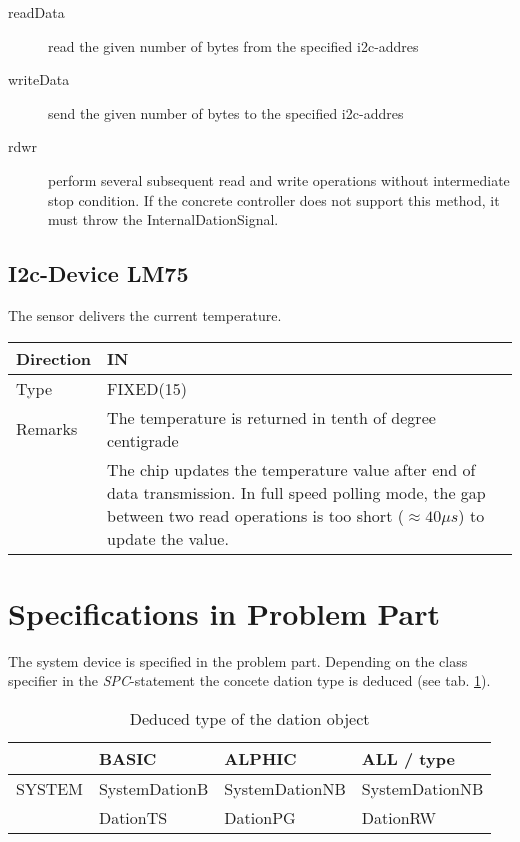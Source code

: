 \begin{description}
\item[readData] read the given number of bytes from the specified 
   i2c-addres
\item[writeData] send the given number of bytes to the specified
    i2c-addres
\item[rdwr] perform several subsequent read and write operations 
   without intermediate stop condition. If the concrete controller
   does not support this method, it must throw the InternalDationSignal.
\end{description}

\subsection{I2c-Device LM75}
The sensor delivers the current temperature.

\begin{tabular}{|l|p{10cm}|}
\hline
Direction & IN \\
\hline
Type & FIXED(15) \\
\hline
Remarks& The temperature is returned in tenth of degree centigrade\\
& The chip updates the temperature value after end of data transmission. 
  In full speed polling mode, the gap between two read operations is too 
  short ($\approx 40 \mu s$) to update the value.\\
\hline
\end{tabular}

\section{Specifications in Problem Part}
The system device is specified in the problem part.
Depending on the class specifier in the {\em SPC}-statement the concete 
dation type is deduced (see tab. \ref{dationTypes}).

\begin{table}[bpht]
\begin{tabular}{l|l|l|l}
  & BASIC & ALPHIC & ALL / type \\
\hline
SYSTEM & SystemDationB & SystemDationNB & SystemDationNB \\
 & DationTS & DationPG & DationRW \\
\hline
\end{tabular}
\caption{Deduced type of the dation object}
\label{dationTypes}
\end{table}


